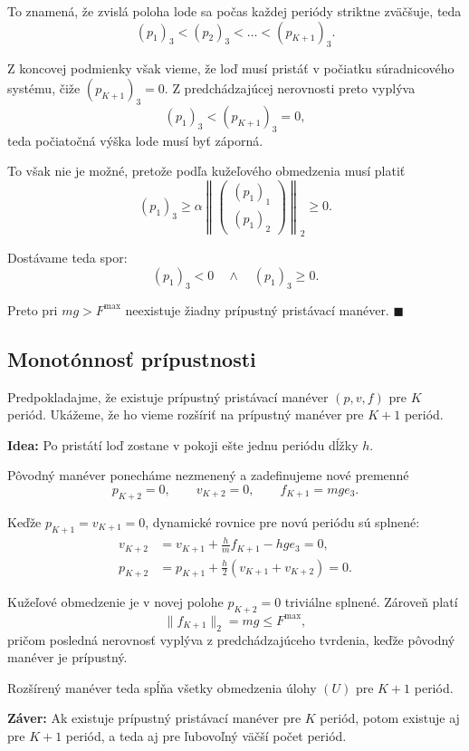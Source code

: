 \documentclass[12pt,a4paper]{article}
\begin{document}
To znamená, že zvislá poloha lode sa počas každej
periódy striktne zväčšuje, teda
\[
(p_1)_3 < (p_2)_3 < \dots < (p_{K+1})_3.
\]

Z koncovej podmienky však vieme, že loď musí
pristáť v počiatku súradnicového systému,
čiže $(p_{K+1})_3 = 0$. Z predchádzajúcej
nerovnosti preto vyplýva
\[
(p_1)_3 < (p_{K+1})_3 = 0,
\]
teda počiatočná výška lode musí byť záporná.

To však nie je možné, pretože podľa kužeľového
obmedzenia musí platiť
\[
(p_1)_3 \ge
\alpha \left\|
\begin{pmatrix}
(p_1)_1\\
(p_1)_2
\end{pmatrix}
\right\|_2 \ge 0.
\]

Dostávame teda spor:
\[
\boxed{(p_1)_3 < 0 \quad \land \quad (p_1)_3 \ge 0.}
\]

Preto pri $mg > F^{\max}$ neexistuje žiadny
prípustný pristávací manéver.
\hfill $\blacksquare$


\subsection*{Monotónnosť prípustnosti}

Predpokladajme, že existuje prípustný pristávací
manéver $(p,v,f)$ pre $K$ periód. Ukážeme, že ho
vieme rozšíriť na prípustný manéver pre $K+1$ periód.

\textbf{Idea:}
Po pristátí loď zostane v pokoji ešte jednu
periódu dĺžky $h$.

Pôvodný manéver ponecháme nezmenený a zadefinujeme
nové premenné
\[
p_{K+2}=0,\qquad
v_{K+2}=0,\qquad
f_{K+1}=mg e_3.
\]

Keďže $p_{K+1}=v_{K+1}=0$, dynamické rovnice
pre novú periódu sú splnené:
\[
\begin{aligned}
v_{K+2}
&=v_{K+1}+\frac{h}{m}f_{K+1}-hg e_3=0,\\
p_{K+2}
&=p_{K+1}+\frac{h}{2}(v_{K+1}+v_{K+2})=0.
\end{aligned}
\]

Kužeľové obmedzenie je v novej polohe $p_{K+2}=0$
triviálne splnené. Zároveň platí
\[
\|f_{K+1}\|_2 = mg \le F^{\max},
\]
pričom posledná nerovnosť vyplýva
z predchádzajúceho tvrdenia, keďže pôvodný
manéver je prípustný.

Rozšírený manéver teda spĺňa všetky obmedzenia
úlohy $(U)$ pre $K+1$ periód.

\textbf{Záver:}
Ak existuje prípustný pristávací manéver pre
$K$ periód, potom existuje aj pre $K+1$ periód,
a teda aj pre ľubovoľný väčší počet periód.
\end{document}
